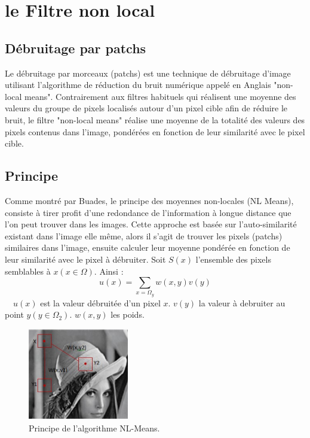 \documentclass[12pt,a4paper]{report}
\numberwithin{equation}{subsection}
\numberwithin{equation}{section}
\begin{document}
\section{le Filtre non local }
\subsection{Débruitage par patchs}
Le débruitage par morceaux (patchs) est une technique de débruitage d'image utilisant l'algorithme de réduction du bruit numérique appelé en Anglais "non-local means". Contrairement aux filtres habituels qui réalisent une moyenne des valeurs du groupe de pixels localisés autour d'un pixel cible afin de réduire le bruit, le filtre "non-local means" réalise une moyenne de la totalité des valeurs des pixels contenus dans l'image, pondérées en fonction de leur similarité avec le pixel cible. 
\subsection{Principe}
Comme montré par Buades, le principe des moyennes non-locales
(NL Means), consiste à tirer profit d’une redondance de l’information à longue distance que l’on peut trouver dans les images. Cette approche est basée sur l’auto-similarité existant dans l’image elle même, alors il s’agit de trouver les pixels (patchs) similaires dans l’image, ensuite calculer leur moyenne pondérée en fonction de leur similarité avec
le pixel à débruiter. \newline
Soit $S(x)$  l’ensemble des pixels semblables à $x(x \in \Omega)$. Ainsi :
$$
u(x)=\sum_{x=\Omega_{y}} w(x, y) v(y)
$$
\newline
$\quad u(x)$ est la valeur débruitée d'un pixel $x$.\newline
$v(y)$ la valeur à debruiter au point $y\left(y \in \Omega_{2}\right)$.\newline
$w(x, y)$ les poids.\newline
\begin{figure}[h!]
    \centering
    \includegraphics[height=4cm , width=.3\textwidth]{NLmeans.jpg}
     \caption{Principe de l’algorithme NL-Means.}
\end{figure}
\end{document}
